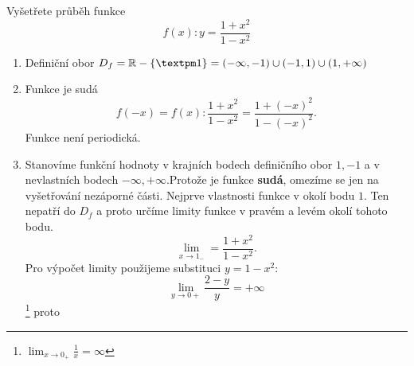 \begin{mdframed}[style=mdexam]
  \begin{example}\label{mai:exam003}
    Vyšetřete průběh funkce $$f(x):y=\frac{1+x^2}{1-x^2}$$
    \begin{enumerate}[noitemsep]
      \item Definiční obor $D_f=\realset-\{±1\}=(-\infty,-1)\cup(-1,1)\cup(1,+\infty)$
      \item Funkce je sudá $$f(-x)=f(x): \frac{1+x^2}{1-x^2}=\frac{1+(-x)^2}{1-(-x)^2}.$$ Funkce
          není periodická.
      \item Stanovíme funkční hodnoty v krajních bodech definičního obor $1, -1$ a v nevlastních
          bodech $-\infty,+\infty$.Protože je funkce \textbf{sudá}, omezíme se jen na vyšetřování
          nezáporné části. Nejprve vlastnosti fun\-kce v okolí bodu $1$. Ten nepatří do $D_f$ a
          proto určíme limity funkce v pravém a levém okolí tohoto bodu. $$\lim_{x\to
          1_{-}}=\frac{1+x^2}{1-x^2}.$$ Pro výpočet limity použijeme substituci $y=1-x^2$: 
          $$\lim_{y\to0+}\frac{2-y}{y}=+\infty$$ \footnote{$\lim_{x\to0_+}\frac{1}{x}=\infty$} proto
          

\end{enumerate}
\end{example}
\end{mdframed}
